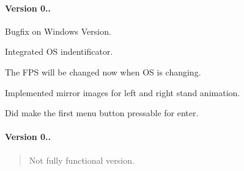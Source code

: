 \paragraph*{Version 0..}

Bugfix on Windows Version.

Integrated O\+S indentificator.

The F\+P\+S will be changed now when O\+S is changing.

Implemented mirror images for left and right stand animation.

Did make the first menu button pressable for enter.

\paragraph*{Version 0..}

\begin{quote}
Not fully functional version.\end{quote}
